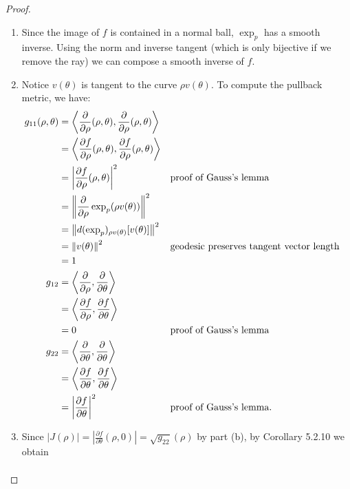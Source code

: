 \documentclass[12pt]{article}
\begin{document}
\begin{proof}
\begin{enumerate}[label=(\alph*)]
	\item Since the image of $ f$ is contained in a normal ball,  $ \exp_p$ has a smooth inverse. Using the norm and inverse tangent (which is only bijective if we remove the ray) we can compose a smooth inverse of $ f$.
	\item Notice $ v(\theta)$ is tangent to the curve $ \rho v(\theta)$. To compute the pullback metric, we have:
		\begin{align*}
			g_{11}(\rho,\theta) &= \left\langle \frac{\partial }{\partial \rho}(\rho,\theta), \frac{\partial }{\partial \rho}(\rho, \theta)  \right\rangle\\
					    &= \left\langle \frac{\partial f}{\partial \rho}(\rho,\theta), \frac{\partial f}{\partial \rho}(\rho, \theta)   \right\rangle \\
		       &= \left| \frac{\partial f}{\partial \rho}(\rho,\theta)  \right|^2  && \text{proof of Gauss's lemma}  \\
			&= {\left\lVert{ \frac{\partial }{\partial \rho} \exp_p (\rho v(\theta)) }\right\rVert}^2  \\
			&= {\left\lVert{ d(\exp_p)_{\rho v(\theta)} [v(\theta)] }\right\rVert}^2  \\
			&= {\left\lVert{ v(\theta)}\right\rVert}^2 && \text{geodesic preserves tangent vector length}    \\
			&= 1 \\
			g_{12} &=  \left\langle \frac{\partial }{\partial \rho}, \frac{\partial }{\partial \theta}   \right\rangle \\
					    &=\left\langle \frac{\partial f}{\partial \rho}, \frac{\partial f}{\partial \theta}  \right\rangle  \\
					    &= 0&& \text{proof of Gauss's lemma}\\
			g_{22} &= \left\langle  \frac{\partial }{\partial \theta}, \frac{\partial }{\partial \theta}\right\rangle \\
			       &= \left\langle \frac{\partial f}{\partial \theta}, \frac{\partial f}{\partial \theta}   \right\rangle \\
			       &=\left| \frac{\partial f}{\partial \theta}  \right|^2  && \text{proof of Gauss's lemma} .
		\end{align*}
	\item Since $ |J(\rho)| = \left| \frac{\partial f}{\partial \theta}(\rho,0)  \right| = \sqrt{g_{22}}(\rho)  $ by part (b), by Corollary 5.2.10 we obtain
\begin{align*}

\end{align*}
\end{enumerate}
\end{proof}
\end{document}
